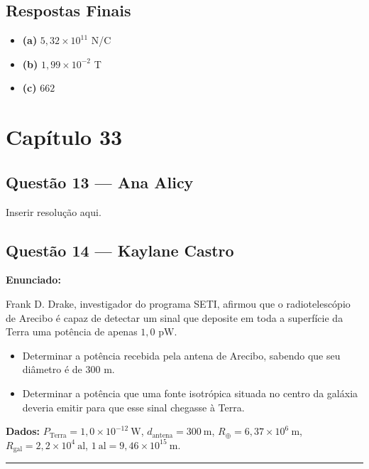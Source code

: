 \documentclass[12pt,a4paper]{article}
\begin{document}
\subsection*{Respostas Finais}
\begin{itemize}
    \item \textbf{(a)} $5,32 \times 10^{11}$ N/C
    \item \textbf{(b)} $1,99 \times 10^{-2}$ T
    \item \textbf{(c)} $662$
\end{itemize}

\section{Capítulo 33}

\subsection{Questão 13 — Ana Alicy}
Inserir resolução aqui.

\subsection{Questão 14 — Kaylane Castro}
\textbf{Enunciado:}

Frank D. Drake, investigador do programa SETI, afirmou que o radiotelescópio de Arecibo é capaz de detectar um sinal que deposite em toda a superfície da Terra uma potência de apenas $1,0\text{ pW}$.

\begin{itemize}
    \item[(a)] Determinar a potência recebida pela antena de Arecibo, sabendo que seu diâmetro é de $300\text{ m}$.
    
    \item[(b)] Determinar a potência que uma fonte isotrópica situada no centro da galáxia deveria emitir para que esse sinal chegasse à Terra.
\end{itemize}

\vspace{0.5cm}

\textbf{Dados:}
$P_\text{Terra} = 1{,}0\times10^{-12}\ \text{W}$,\quad
$d_\text{antena} = 300\ \text{m}$,\quad
$R_\oplus = 6{,}37\times10^6\ \text{m}$,\quad
$R_\text{gal} = 2{,}2\times10^4\ \text{al}$,\quad
$1\ \text{al} = 9{,}46\times10^{15}\ \text{m}$.

\noindent\rule{\linewidth}{0.4pt}
\end{document}
